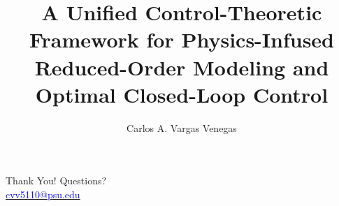 \documentclass[aspectratio=169]{beamer}
\title[]{A Unified Control-Theoretic Framework for Physics-Infused Reduced-Order Modeling and Optimal Closed-Loop Control}
\subtitle{}
\author[]{Carlos A. Vargas Venegas}
\institute{}
\begin{document}
\maketitle








\begin{frame}
    \footnotesize
    \begin{center}
    \Large
    Thank You! Questions?\\
    \underline{\textcolor{blue}{cvv5110@psu.edu}}
    \end{center}
\end{frame}
\end{document}
